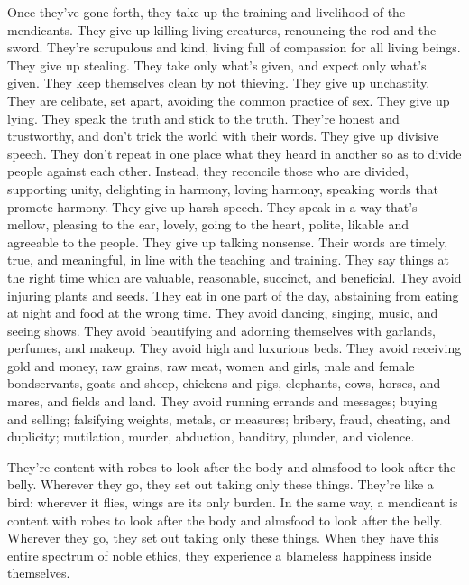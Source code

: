 \documentclass[12pt,openany]{book}%
\begin{document}
Once they’ve gone forth, they take up the training and livelihood of the mendicants. They give up killing living creatures, renouncing the rod and the sword. They’re scrupulous and kind, living full of compassion for all living beings. They give up stealing. They take only what’s given, and expect only what’s given. They keep themselves clean by not thieving. They give up unchastity. They are celibate, set apart, avoiding the common practice of sex. They give up lying. They speak the truth and stick to the truth. They’re honest and trustworthy, and don’t trick the world with their words. They give up divisive speech. They don’t repeat in one place what they heard in another so as to divide people against each other. Instead, they reconcile those who are divided, supporting unity, delighting in harmony, loving harmony, speaking words that promote harmony. They give up harsh speech. They speak in a way that’s mellow, pleasing to the ear, lovely, going to the heart, polite, likable and agreeable to the people. They give up talking nonsense. Their words are timely, true, and meaningful, in line with the teaching and training. They say things at the right time which are valuable, reasonable, succinct, and beneficial. They avoid injuring plants and seeds. They eat in one part of the day, abstaining from eating at night and food at the wrong time. They avoid dancing, singing, music, and seeing shows. They avoid beautifying and adorning themselves with garlands, perfumes, and makeup. They avoid high and luxurious beds. They avoid receiving gold and money, raw grains, raw meat, women and girls, male and female bondservants, goats and sheep, chickens and pigs, elephants, cows, horses, and mares, and fields and land. They avoid running errands and messages; buying and selling; falsifying weights, metals, or measures; bribery, fraud, cheating, and duplicity; mutilation, murder, abduction, banditry, plunder, and violence. 

They’re content with robes to look after the body and almsfood to look after the belly. Wherever they go, they set out taking only these things. They’re like a bird: wherever it flies, wings are its only burden. In the same way, a mendicant is content with robes to look after the body and almsfood to look after the belly. Wherever they go, they set out taking only these things. When they have this entire spectrum of noble ethics, they experience a blameless happiness inside themselves. 
\end{document}
